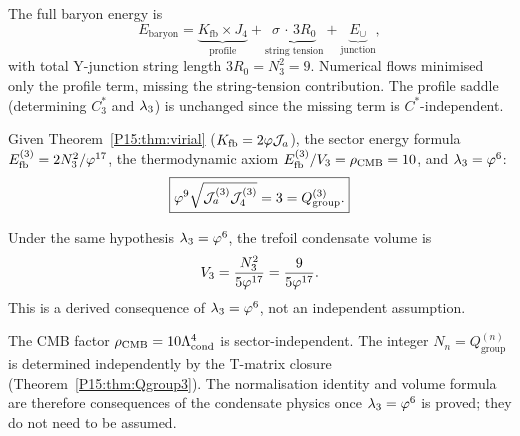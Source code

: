 \begin{remark}
\label{P15:rem:yjunction_energy}
The full baryon energy is
\begin{equation}
  E_{\mathrm{baryon}} = \underbrace{K_{\mathrm{fb}}\times J_4}_{\text{profile}}
  + \underbrace{\sigma\,\cdot\,3R_0}_{\text{string tension}}
  + \underbrace{E_\cup}_{\text{junction}},
  \label{P15:eq:baryon_energy}
\end{equation}
with total Y-junction string length $3R_0 = N_3^2 = 9$.
Numerical flows minimised only the profile term, missing the
string-tension contribution. The profile saddle (determining $C_3^*$
and $\lambda_3$) is unchanged since the missing term is $C^*$-independent.
\end{remark}

\begin{theorem}
\label{P15:thm:norm3}
Given Theorem~\ref{P15:thm:virial} ($K_{\mathrm{fb}}=2\varphi\mathcal{J}_a$), the sector energy
formula $E_{\mathrm{fb}}^{(3)}=2N_3^2/\varphi^{17}$, the thermodynamic axiom
$E_{\mathrm{fb}}^{(3)}/V_3=\rho_{\mathrm{CMB}}=10$, and $\lambda_3=\varphi^6$:
\begin{equation}
  \boxed{\varphi^9\sqrt{\mathcal{J}_a^{(3)}\mathcal{J}_4^{(3)}}
  = 3 = Q_{\mathrm{group}}^{(3)}.}
  \label{P15:eq:norm3}
\end{equation}
\end{theorem}

\begin{corollary}
\label{P15:cor:V3}
Under the same hypothesis $\lambda_3=\varphi^6$,
the trefoil condensate volume is
\begin{equation}
  V_3 = \frac{N_3^2}{5\varphi^{17}} = \frac{9}{5\varphi^{17}}.
  \label{P15:eq:V3}
\end{equation}
This is a derived consequence of $\lambda_3=\varphi^6$, not an independent
assumption.
\end{corollary}

\begin{remark}[Why $N_3=3$ is forced]
\label{P15:rem:why_N3_forced}
The CMB factor $\rho_{\mathrm{CMB}}=10\Lambda_{\mathrm{cond}}^4$ is sector-independent.
The integer $N_n=Q_{\mathrm{group}}^{(n)}$ is determined independently
by the T-matrix closure (Theorem~\ref{P15:thm:Qgroup3}).
The normalisation identity and volume formula are therefore
consequences of the condensate physics once $\lambda_3=\varphi^6$ is proved;
they do not need to be assumed.
\end{remark}

